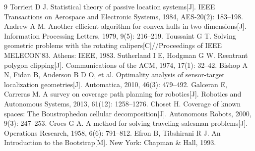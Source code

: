 \begin{thebibliography}{9}
     Torrieri D J. Statistical theory of passive location systems[J]. IEEE Transactions on Aerospace and Electronic Systems, 1984, AES-20(2): 183--198.
     Andrew A M. Another efficient algorithm for convex hulls in two dimensions[J]. Information Processing Letters, 1979, 9(5): 216--219.
     Toussaint G T. Solving geometric problems with the rotating calipers[C]//Proceedings of IEEE MELECON'83. Athens: IEEE, 1983.
     Sutherland I E, Hodgman G W. Reentrant polygon clipping[J]. Communications of the ACM, 1974, 17(1): 32--42.
     Bishop A N, Fidan B, Anderson B D O, et al. Optimality analysis of sensor-target localization geometries[J]. Automatica, 2010, 46(3): 479--492.
     Galceran E, Carreras M. A survey on coverage path planning for robotics[J]. Robotics and Autonomous Systems, 2013, 61(12): 1258--1276.
     Choset H. Coverage of known spaces: The Boustrophedon cellular decomposition[J]. Autonomous Robots, 2000, 9(3): 247--253.
     Croes G A. A method for solving traveling-salesman problems[J]. Operations Research, 1958, 6(6): 791--812.
     Efron B, Tibshirani R J. An Introduction to the Bootstrap[M]. New York: Chapman \& Hall, 1993.
\end{thebibliography}
